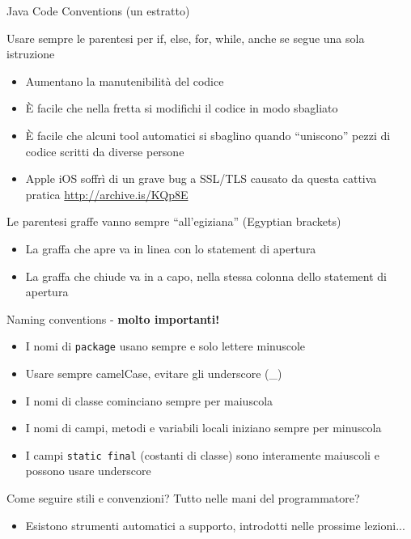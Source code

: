 \documentclass[xcolor=dvipsnames,presentation]{beamer}
\begin{document}
\begin{frame}[allowframebreaks]{Java Code Conventions (un estratto)}
	\begin{block}{Usare sempre le parentesi per if, else, for, while, anche se segue una sola istruzione}
		\begin{itemize}
			\item Aumentano la manutenibilità del codice
			\item È facile che nella fretta si modifichi il codice in modo sbagliato
			\item È facile che alcuni tool automatici si sbaglino quando ``uniscono'' pezzi di codice scritti da diverse persone
			\item Apple iOS soffrì di un grave bug a SSL/TLS causato da questa cattiva pratica \url{http://archive.is/KQp8E}
		\end{itemize}
	\end{block}
	\begin{block}{Le parentesi graffe vanno sempre ``all'egiziana'' (Egyptian brackets)}
		\begin{itemize}
			\item La graffa che apre va in linea con lo statement di apertura
			\item La graffa che chiude va in a capo, nella stessa colonna dello statement di apertura
		\end{itemize}
	\end{block}
	\begin{block}{Naming conventions - \textbf{molto importanti!}}
		\begin{itemize}
			\item I nomi di \texttt{package} usano sempre e solo lettere minuscole
			\item Usare sempre camelCase, evitare gli underscore (\_)
			\item I nomi di classe cominciano sempre per maiuscola
			\item I nomi di campi, metodi e variabili locali iniziano sempre per minuscola
			\item I campi \texttt{static final} (costanti di classe) sono interamente maiuscoli e possono usare underscore
		\end{itemize}
	\end{block}

Come seguire stili e convenzioni? Tutto nelle mani del programmatore?
\begin{itemize}
\item Esistono strumenti automatici a supporto, introdotti nelle prossime lezioni...
	\end{itemize}
\end{frame}
\end{document}
